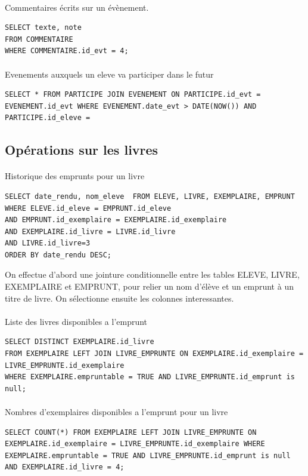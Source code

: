 \documentclass[a4paper, 11pt]{article}
\begin{document}
\paragraph{}
Commentaires écrits sur un évènement.
\begin{verbatim}
SELECT texte, note 
FROM COMMENTAIRE
WHERE COMMENTAIRE.id_evt = 4;
\end{verbatim}
\paragraph{}
Evenements auxquels un eleve va participer dans le futur
\begin{verbatim}
SELECT * FROM PARTICIPE JOIN EVENEMENT ON PARTICIPE.id_evt = EVENEMENT.id_evt WHERE EVENEMENT.date_evt > DATE(NOW()) AND  PARTICIPE.id_eleve = 
\end{verbatim}
\subsection{Opérations sur les livres}
\paragraph{}
Historique des emprunts pour un livre
\begin{verbatim}
SELECT date_rendu, nom_eleve  FROM ELEVE, LIVRE, EXEMPLAIRE, EMPRUNT 
WHERE ELEVE.id_eleve = EMPRUNT.id_eleve 
AND EMPRUNT.id_exemplaire = EXEMPLAIRE.id_exemplaire  
AND EXEMPLAIRE.id_livre = LIVRE.id_livre  
AND LIVRE.id_livre=3 
ORDER BY date_rendu DESC;
\end{verbatim}
On effectue d'abord une jointure conditionnelle entre les tables ELEVE, LIVRE, EXEMPLAIRE et EMPRUNT, pour relier un nom d'élève et un emprunt à un titre de livre. On sélectionne ensuite les colonnes interessantes.
\paragraph{}
Liste des livres disponibles a l'emprunt
\begin{verbatim}
SELECT DISTINCT EXEMPLAIRE.id_livre 
FROM EXEMPLAIRE LEFT JOIN LIVRE_EMPRUNTE ON EXEMPLAIRE.id_exemplaire = LIVRE_EMPRUNTE.id_exemplaire
WHERE EXEMPLAIRE.empruntable = TRUE AND LIVRE_EMPRUNTE.id_emprunt is null;
\end{verbatim}
\paragraph{}
Nombres d'exemplaires disponibles a l'emprunt pour un livre
\begin{verbatim}
SELECT COUNT(*) FROM EXEMPLAIRE LEFT JOIN LIVRE_EMPRUNTE ON EXEMPLAIRE.id_exemplaire = LIVRE_EMPRUNTE.id_exemplaire WHERE EXEMPLAIRE.empruntable = TRUE AND LIVRE_EMPRUNTE.id_emprunt is null AND EXEMPLAIRE.id_livre = 4;
\end{verbatim}
\end{document}
